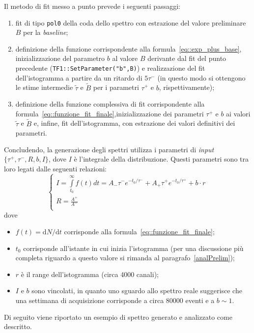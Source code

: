 \documentclass[10pt, oneside, a4paper]{article}   	%
\renewcommand{\d}{\mathrm{d}}
\begin{document}
Il metodo di fit messo a punto prevede i seguenti passaggi:
\begin{enumerate}
 \item fit di tipo \lstinline{pol0} della coda dello spettro con estrazione del valore preliminare $B$ per la \textit{baseline};
 \item definizione della funzione corrispondente alla formula~\ref{eq::exp_plus_base}, inizializzazione del parametro $b$ al valore $B$ derivante dal fit del punto precedente (\lstinline{TF1::SetParameter("b",B)}) e realizzazione del fit dell'istogramma a partire da un ritardo di $5\tau^-$ (in questo modo si ottengono le stime intermedie $\widetilde{\tau}$  e $\widetilde{B}$ per i parametri $\tau^+$ e $b$, rispettivamente);
 \item definizione della funzione complessiva di fit corrispondente alla formula~\ref{eq::funzione_fit_finale},inizializzazione dei parametri $\tau^+$ e $b$ ai valori  $\widetilde{\tau}$ e $\widetilde{B}$ e, infine, fit dell'istogramma, con estrazione dei valori definitivi dei parametri. 
%
\end{enumerate}  
Concludendo, la generazione degli spettri utilizza i parametri di \textit{input} $\{\tau^+,\tau^-,R,b,I\}$, dove $I$ è l'integrale della distribuzione. Questi parametri sono tra loro legati dalle seguenti relazioni:
\begin{equation*}
  \begin{cases}
    I = \int\limits_{t_0}^\infty f(t)dt = A_-\tau^-e^{-t_0 / \tau^-} + A_+\tau^+e^{-t_0 / \tau^+} + b\cdot r \\
    R = \frac{A^+}{A^-} \\
  \end{cases}
  \label{eq::condizioni_parametri}
\end{equation*}
dove 
\begin{itemize}
 \item $f(t) = \d N/\d t$ corrisponde alla formula~\ref{eq::funzione_fit_finale};
 \item $t_0$ corrisponde all'istante in cui inizia l'istogramma (per una discussione più completa riguardo a questo valore si rimanda al paragrafo~\cref{analPrelim});
 \item $r$ è il range dell'istogramma (circa 4000 canali);
 \item $I$ e $b$ sono vincolati, in quanto uno sguardo allo spettro reale suggerisce che una settimana di acquisizione corrisponde a circa 80000 eventi e a $b\sim1 $.
\end{itemize}
Di seguito viene riportato un esempio di spettro generato e analizzato come descritto.
\end{document}
